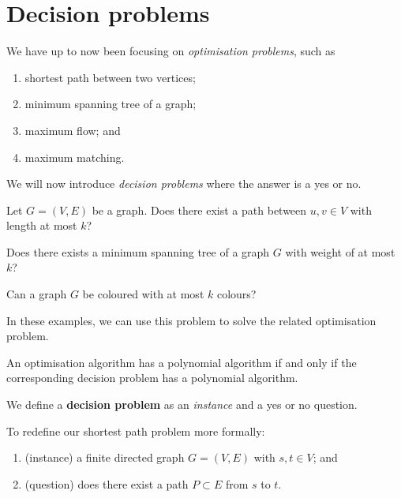 \chapter{Decision problems}

We have up to now been focusing on \emph{optimisation problems}, such as
\begin{enumerate}
    \item shortest path between two vertices;
    \item minimum spanning tree of a graph;
    \item maximum flow; and
    \item maximum matching.
\end{enumerate}
We will now introduce \emph{decision problems} where the answer is
a yes or no.

\begin{problem}
    Let $G = (V,E)$ be a graph.
    Does there exist a path between $u,v \in V$
    with length at most $k$?
\end{problem}

\begin{problem}
    Does there exists a minimum spanning tree of a graph $G$
    with weight of at most $k$?
\end{problem}

\begin{problem}
    Can a graph $G$ be coloured with at most $k$ colours?
\end{problem}

In these examples, we can use this problem to solve the related
optimisation problem.

\begin{theorem}[]
    An optimisation algorithm has a polynomial algorithm
    if and only if the corresponding decision problem
    has a polynomial algorithm.
\end{theorem}

\begin{definition}
    We define a \textbf{decision problem} as an \emph{instance} 
    and a yes or no question.
\end{definition}

\begin{example}
    To redefine our shortest path problem more formally:
    \begin{enumerate}
        \item (instance) a finite directed graph $G = (V,E)$ with $s,t \in V$; and
        \item (question) does there exist a path $P \subset E$
            from $s$ to $t$.
    \end{enumerate}
\end{example}

